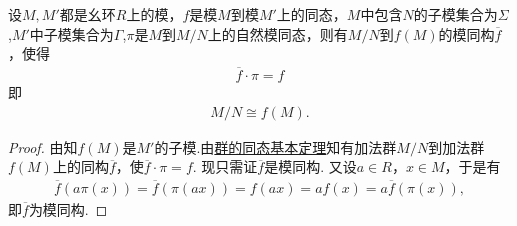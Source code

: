\documentclass[../../main.tex]{subfiles}%
\begin{document}
\begin{theorem}[模同态的基本定理]\label{theorem:模同态的基本定理}
设$M, M'$都是幺环$R$上的模，$f$是模$M$到模$M'$上的同态，$M$中包含$N$的子模集合为$\Sigma$,$M'$中子模集合为$\Gamma$,$\pi$是$M$到$M/N$上的自然模同态，则有$M/N$到$f(M)$的模同构$\overline{f}$，使得
\begin{align}
\overline{f} \cdot \pi = f \label{eq::::--928fh3489h4h3t4g1.7.10}
\end{align}
即
\begin{align*}
M/N \cong f(M).
\end{align*}
\end{theorem}
\begin{proof}

由知$f(M)$是$M'$的子模.由\hyperref[theorem:群的同态基本定理]{群的同态基本定理}知有加法群$M/N$到加法群$f(M)$上的同构$\overline{f}$，使$\overline{f} \cdot \pi = f$. 现只需证$\overline{f}$是模同构. 又设$a \in R$，$x \in M$，于是有
\begin{align*}
\overline{f}(a\pi(x)) = \overline{f}(\pi(ax)) = f(ax) = af(x) = a\overline{f}(\pi(x)),
\end{align*}
即$\overline{f}$为模同构. 

\end{proof}
\end{document}
